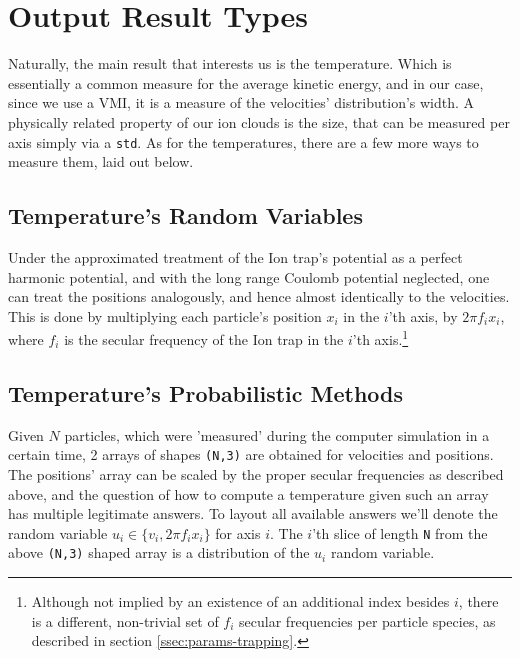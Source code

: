 
\section{Output Result Types}

Naturally, the main result that interests us is the temperature. Which is essentially a common measure for the average kinetic energy, and in our case, since we use a VMI, it is a measure of the velocities' distribution's width. A physically related property of our ion clouds is the size, that can be measured per axis simply via a \texttt{std}. As for the temperatures, there are a few more ways to measure them, laid out below. 

\subsection{Temperature's Random Variables}

Under the approximated treatment of the Ion trap's potential as a perfect harmonic potential, and with the long range Coulomb potential neglected, one can treat the positions analogously, and hence almost identically to the velocities. This is done by multiplying each particle's position $x_i$ in the $i$'th axis, by $2\pi f_i x_i$, where $f_i$ is the secular frequency of the Ion trap in the $i$'th axis.\footnote{Although not implied by an existence of an additional index besides $i$, there is a different, non-trivial set of $f_i$ secular frequencies per particle species, as described in section \ref{ssec:params-trapping}.}

\subsection{Temperature's Probabilistic Methods}

Given $N$ particles, which were 'measured' during the computer simulation in a certain time, 2 arrays of shapes \texttt{(N,3)} are obtained for velocities and positions. The positions' array can be scaled by the proper secular frequencies as described above, and the question of how to compute a temperature given such an array has multiple legitimate answers. To layout all available answers we'll denote the random variable $u_i \in \{v_i, 2\pi f_i x_i\}$ for axis $i$. The $i$'th slice of length \texttt{N} from the above \texttt{(N,3)} shaped array is a distribution of the $u_i$ random variable.


